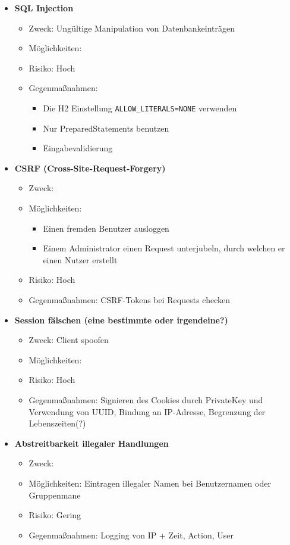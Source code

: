 \documentclass[12pt,DIV14,BCOR10mm,a4paper,twoside,parskip=half-,headsepline,headinclude,english,ngerman,bibliography=totocnumbered]{scrreprt}
\begin{document}
\begin{itemize}
  \item \textbf{SQL Injection}
  \begin{itemize}
  \item Zweck: Ungültige Manipulation von Datenbankeinträgen
  \item Möglichkeiten:
  \item Risiko: Hoch
  \item Gegenmaßnahmen:
  \begin{itemize}
    \item Die H2 Einstellung \texttt{ALLOW\_LITERALS=NONE} verwenden
    \item Nur PreparedStatements benutzen
    \item Eingabevalidierung
  \end{itemize}
  \end{itemize}

  \item \textbf{CSRF (Cross-Site-Request-Forgery)}
  \begin{itemize}
  \item Zweck:
  \item Möglichkeiten:
  \begin{itemize}
          \item Einen fremden Benutzer ausloggen
          \item Einem Administrator einen Request unterjubeln, durch welchen er einen Nutzer erstellt
      \end{itemize}
  \item Risiko: Hoch
  \item Gegenmaßnahmen: CSRF-Tokens bei Requests checken
  \end{itemize}

  \item \textbf{Session fälschen (eine bestimmte oder irgendeine?)}
  \begin{itemize}
  \item Zweck: Client spoofen
  \item Möglichkeiten:
  \item Risiko: Hoch
  \item Gegenmaßnahmen: Signieren des Cookies durch PrivateKey und Verwendung von UUID, Bindung an IP-Adresse, Begrenzung der Lebenszeiten(?)
  \end{itemize}

  \item \textbf{Abstreitbarkeit illegaler Handlungen}
  \begin{itemize}
  \item Zweck:
  \item Möglichkeiten: Eintragen illegaler Namen bei Benutzernamen oder Gruppenmane
  \item Risiko: Gering
  \item Gegenmaßnahmen: Logging von IP + Zeit, Action, User
  \end{itemize}


\end{itemize}
\end{document}
